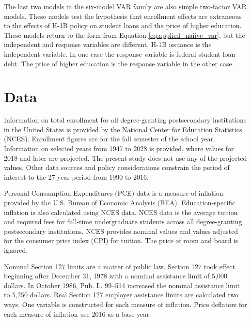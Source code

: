 \documentclass[review]{elsarticle}
\begin{document}

The last two models in the six-model VAR family are also simple two-factor VAR models.
These models test the hypothesis that enrollment effects are extraneous
to the effects of H-1B policy on student loans and the price of higher education.
These models return to the form from Equation \ref{eq:applied_naiive_var},
but the independent and response variables are different.
H-1B issuance is the independent variable.
In one case the response variable is federal student loan debt.
The price of higher education is the response variable in the other case.

\section{Data}

Information on total enrollment for all degree-granting postsecondary institutions in the United States
is provided by the National Center for Education Statistics (NCES)\cite{nces_2019}.
Enrollment figures are for the fall semester of the school year.
Information on selected years from 1947 to 2028 is provided, where values for 2018 and later are projected.
The present study does not use any of the projected values.
Other data sources and policy considerations constrain the period of interest to the 27-year period from 1990 to 2016.

Personal Consumption Expenditures (PCE) data is a measure of inflation provided by the U.S. Bureau of Economic Analysis (BEA)\cite{bea_2020}.
Education-specific inflation is also calculated using NCES data\cite{nces_2017}.
NCES data is the average tuition and required fees for full-time undergraduate students across all degree-granting postsecondary institutions.
NCES provides nominal values and values adjusted for the consumer price index (CPI) for tuition.
The price of room and board is ignored.

Nominal Section 127 limits are a matter of public law.
Section 127 took effect beginning after December 31, 1978 with a nominal assistance limit of 5,000 dollars\cite{plaw95_600_1978}.
In October 1986, Pub. L. 99–514 increased the nominal assistance limit to 5,250 dollars\cite{plaw99_514_1986}.
Real Section 127 employer assistance limits are calculated two ways.
One variable is constructed for each measure of inflation.
Price deflators for each measure of inflation use 2016 as a base year.
\end{document}
